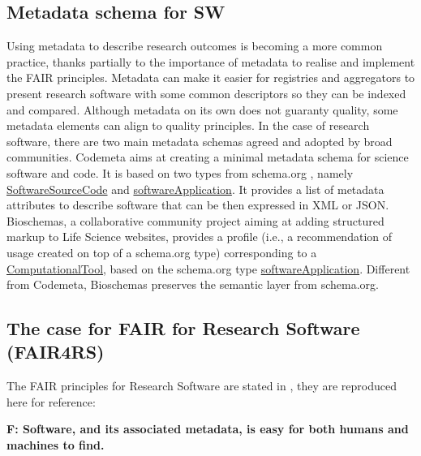 \subsection{Metadata schema for SW}

Using metadata to describe research outcomes is becoming a more common practice, thanks partially to the importance of metadata to realise and implement the FAIR principles. Metadata can make it easier for registries and aggregators to present research software with some common descriptors so they can be indexed and compared. Although metadata on its own does not guaranty quality, some metadata elements can align to quality principles. In the case of research software, there are two main metadata schemas agreed and adopted by broad communities. Codemeta \cite{Boettigeral2017} aims at creating a minimal metadata schema for science software and code. It is based on two types from schema.org \cite{guha_schemaorg_2016}, namely \href{https://schema.org/SoftwareSourceCode}{SoftwareSourceCode} and \href{https://schema.org/SoftwareApplication}{softwareApplication}. It provides a list of metadata attributes to describe software that can be then expressed in XML or JSON. Bioschemas, a collaborative community project aiming at adding structured markup to Life Science websites, provides a profile (i.e., a recommendation of usage created on top of a schema.org type) corresponding to a \href{https://bioschemas.org/profiles/ComputationalTool}{ComputationalTool}, based on the schema.org type \href{https://schema.org/SoftwareApplication}{softwareApplication}. Different from Codemeta, Bioschemas preserves the semantic layer from schema.org.

\subsection{The case for FAIR for Research Software (FAIR4RS)}

The FAIR principles for Research Software are stated in \cite{chue_hong_neil_p_2022_6623556}, they
are reproduced here for reference:

\textbf{F: Software, and its associated metadata, is easy for both humans and machines to find.}

